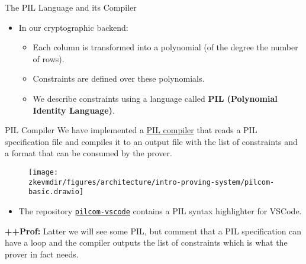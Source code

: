 \begin{frame}{The PIL Language and its Compiler}
\begin{itemize}
\item In our cryptographic backend:
  \begin{itemize}
  \item Each column is transformed into a polynomial (of the degree the number of rows).
  \item Constraints are defined over these polynomials.
  \item We describe constraints using a language called \textbf{PIL (Polynomial Identity Language)}.
  \end{itemize}
\end{itemize}

\small
\begin{block}{PIL Compiler}
We have implemented a \href{https://github.com/0xPolygonHermez/pilcom}{PIL compiler} that reads a PIL specification file and compiles it to an output file with the list of constraints and a format that can be consumed by the prover.
\end{block}
\begin{figure}
\texttt{[image: \\zkevmdir/figures/architecture/intro-proving-system/pilcom-basic.drawio]}
\end{figure}
\begin{itemize}
\item The repository \href{https://github.com/0xPolygonHermez/pilcom-vscode}{\texttt{pilcom-vscode}} contains a PIL syntax highlighter for VSCode.
\end{itemize}
\ifPROF
\footnotesize
\textbf{++Prof:} Latter we will see some PIL, but comment that a PIL specification can have a loop and the compiler
outputs the list of constraints which is what the prover in fact needs.
\normalsize
\fi
\end{frame}






